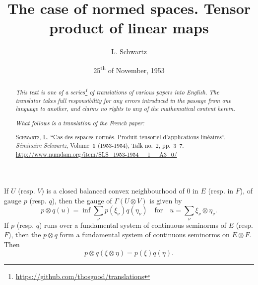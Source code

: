 \documentclass{article}
\title{The case of normed spaces. Tensor product of linear maps}
\author{L. Schwartz}
\date{25\textsuperscript{th} of November, 1953}
\theoremstyle{plain}
\newenvironment{proposition}[1]
    {\renewcommand\theinnercustomproposition{#1}\innercustomproposition}
    {\endinnercustomproposition}
\theoremstyle{definition}
\newcommand{\oldpage}[1]{\marginpar{\footnotesize$\Big\vert$ \textit{p.~#1}}}
\begin{document}
\maketitle
\thispagestyle{fancy}

\renewcommand{\abstractname}{Translator's note.}

\begin{abstract}
  \renewcommand*{\thefootnote}{\fnsymbol{footnote}}
  \emph{This text is one of a series\footnote{\url{https://github.com/thosgood/translations}} of translations of various papers into English.}
  \emph{The translator takes full responsibility for any errors introduced in the passage from one language to another, and claims no rights to any of the mathematical content herein.}
  
  \emph{What follows is a translation of the French paper:}

  \medskip\noindent
  \textsc{Schwartz, L.}
  ``Cas des espaces norm\'{e}s. Produit tensoriel d'applications lin\'{e}aires''.
  \emph{S\'{e}minaire Schwartz}, Volume~\textbf{1} (1953-1954), Talk no.~2, pp.~3--7.
  {\footnotesize\url{http://www.numdam.org/item/SLS_1953-1954__1__A3_0/}}
\end{abstract}

\setcounter{footnote}{0}



\oldpage{3}
\begin{proposition}{1}
  If $U$ (resp. $V$) is a closed balanced convex neighbourhood of $0$ in $E$ (resp. in $F$), of gauge $p$ (resp. $q$), then the gauge of $\Gamma(U\otimes V)$ is given by
  \[
  \label{equation1}
    p\otimes q(u) = \inf\sum_\nu p(\xi_\nu)q(\eta_\nu)
    \quad\text{for}\quad
    u=\sum_\nu\xi_\nu\otimes\eta_\nu.
  \tag{1}
  \]
  If $p$ (resp. $q$) runs over a fundamental system of continuous seminorms of $E$ (resp. $F$), then the $p\otimes q$ form a fundamental system of continuous seminorms on $E\otimes F$.
  Then
  \[
  \label{equation2}
    p\otimes q(\xi\otimes\eta) = p(\xi)q(\eta).
  \tag{2}
  \]
\end{proposition}
\end{document}
